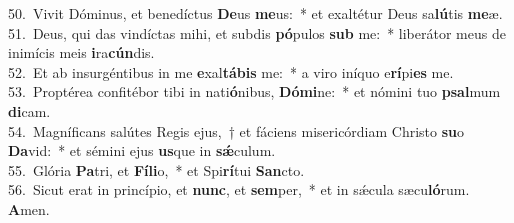 {50.~}Vivit Dóminus, et benedíctus \textbf{De}us \textbf{me}us:~* et exaltétur Deus sa\textbf{lú}tis \textbf{me}æ.\\
{51.~}Deus, qui das vindíctas mihi, et subdis \textbf{pó}pulos \textbf{sub} me:~* liberátor meus de inimícis meis \textbf{i}ra\textbf{cún}dis.\\
{52.~}Et ab insurgéntibus in me \textbf{e}xal\textbf{tá}\textbf{bis} me:~* a viro iníquo e\textbf{rí}pi\textbf{es} me.\\
{53.~}Proptérea confitébor tibi in nati\textbf{ó}nibus, \textbf{Dó}\textbf{mi}ne:~* et nómini tuo \textbf{psal}mum \textbf{di}cam.\\
{54.~}Magníficans salútes Regis ejus,~† et fáciens misericórdiam Christo \textbf{su}o \textbf{Da}vid:~* et sémini ejus \textbf{us}que in \textbf{sǽ}culum.\\
{55.~}Glória \textbf{Pa}tri, et \textbf{Fí}\textbf{li}o,~* et Spi\textbf{rí}tui \textbf{San}cto.\\
{56.~}Sicut erat in princípio, et \textbf{nunc}, et \textbf{sem}per,~* et in sǽcula sæcu\textbf{ló}rum. \textbf{A}men.\\
